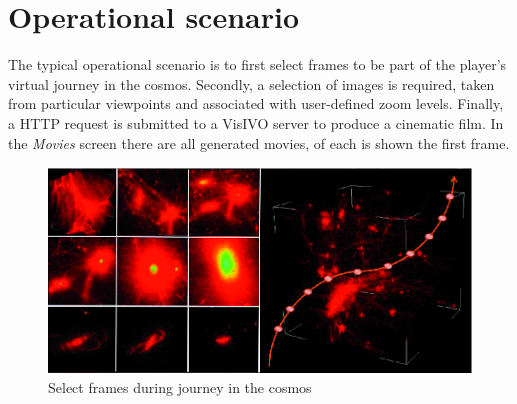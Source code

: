 \section{Operational scenario}
The typical operational scenario is to first select frames to be part of the player's virtual journey in the cosmos. Secondly, a selection of images is required, taken from particular viewpoints and associated with user-defined zoom levels. Finally, a HTTP request is submitted to a VisIVO server to produce a cinematic film.
In the \emph{Movies} screen there are all generated movies, of each  is shown the first frame.
\begin{figure}[h]
\centering
\includegraphics[scale=0.9]{part5/Massimino_O24/P024_f2}
\caption{Select frames during journey in the cosmos}
\end{figure}

